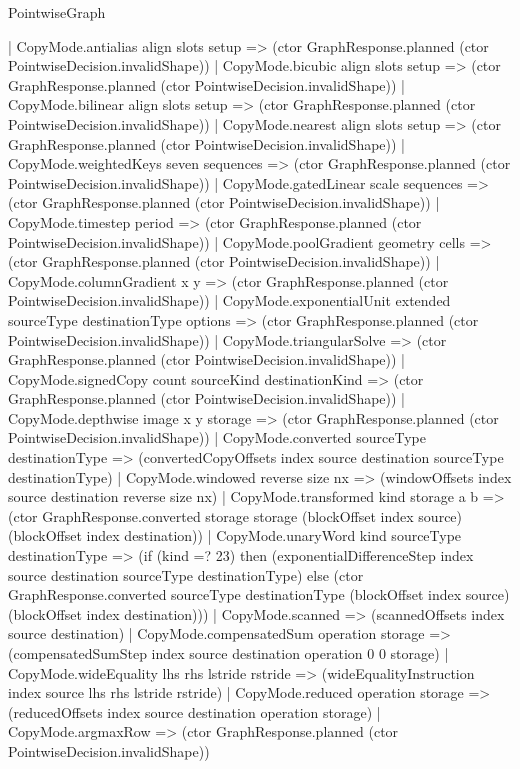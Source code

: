 \begin{lexlean}{PointwiseGraph}
\begin{semanticmodule}
{    | CopyMode.antialias align slots setup => (ctor GraphResponse.planned (ctor PointwiseDecision.invalidShape))
    | CopyMode.bicubic align slots setup => (ctor GraphResponse.planned (ctor PointwiseDecision.invalidShape))
    | CopyMode.bilinear align slots setup => (ctor GraphResponse.planned (ctor PointwiseDecision.invalidShape))
    | CopyMode.nearest align slots setup => (ctor GraphResponse.planned (ctor PointwiseDecision.invalidShape))
    | CopyMode.weightedKeys seven sequences => (ctor GraphResponse.planned (ctor PointwiseDecision.invalidShape))
    | CopyMode.gatedLinear scale sequences => (ctor GraphResponse.planned (ctor PointwiseDecision.invalidShape))
    | CopyMode.timestep period => (ctor GraphResponse.planned (ctor PointwiseDecision.invalidShape))
    | CopyMode.poolGradient geometry cells => (ctor GraphResponse.planned (ctor PointwiseDecision.invalidShape))
    | CopyMode.columnGradient x y => (ctor GraphResponse.planned (ctor PointwiseDecision.invalidShape))
    | CopyMode.exponentialUnit extended sourceType destinationType options => (ctor GraphResponse.planned (ctor PointwiseDecision.invalidShape))
    | CopyMode.triangularSolve => (ctor GraphResponse.planned (ctor PointwiseDecision.invalidShape))
    | CopyMode.signedCopy count sourceKind destinationKind => (ctor GraphResponse.planned (ctor PointwiseDecision.invalidShape))
    | CopyMode.depthwise image x y storage => (ctor GraphResponse.planned (ctor PointwiseDecision.invalidShape))
    | CopyMode.converted sourceType destinationType => (convertedCopyOffsets index source destination sourceType destinationType)
    | CopyMode.windowed reverse size nx => (windowOffsets index source destination reverse size nx)
    | CopyMode.transformed kind storage a b => (ctor GraphResponse.converted storage storage (blockOffset index source) (blockOffset index destination))
    | CopyMode.unaryWord kind sourceType destinationType => (if (kind =? 23) then (exponentialDifferenceStep index source destination sourceType destinationType) else (ctor GraphResponse.converted sourceType destinationType (blockOffset index source) (blockOffset index destination)))
    | CopyMode.scanned => (scannedOffsets index source destination)
    | CopyMode.compensatedSum operation storage => (compensatedSumStep index source destination operation 0 0 storage)
    | CopyMode.wideEquality lhs rhs lstride rstride => (wideEqualityInstruction index source lhs rhs lstride rstride)
    | CopyMode.reduced operation storage => (reducedOffsets index source destination operation storage)
    | CopyMode.argmaxRow => (ctor GraphResponse.planned (ctor PointwiseDecision.invalidShape))
}
\end{semanticmodule}
\end{lexlean}
